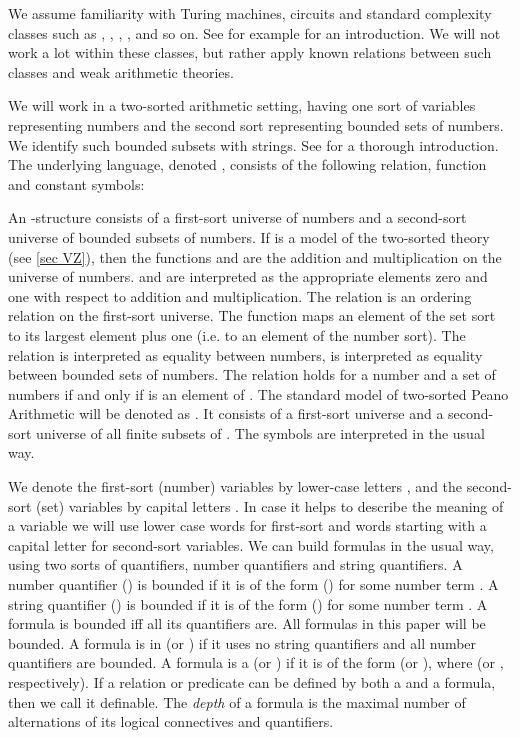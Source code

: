 \documentclass{LMCS}
\begin{document}
We assume familiarity with Turing machines, circuits and standard complexity classes such as ,
, , ,  and so on. See for example
\cite{AB09} for an introduction. We will not work a lot within these classes, but rather apply known relations
between such classes and weak arithmetic theories.

We will work in a two-sorted arithmetic setting, having one sort of variables representing numbers and the
second sort representing bounded sets of numbers. We identify such bounded subsets with strings. See \cite{CN10}
for a thorough introduction. The underlying language, denoted \LTwoA, consists of the following relation,
function and constant symbols:

An  \LTwoA-structure  consists of a first-sort universe  of numbers and a second-sort universe 
of bounded subsets of numbers.  If  is a model of the two-sorted theory  (see \ref{sec VZ}), then the
functions  and  are the addition and multiplication on the universe of numbers.  and  are
interpreted as the appropriate elements zero and one with respect to addition and multiplication. The relation
 is an ordering relation on the first-sort universe. The function  maps an element of the set
sort to its largest element plus one (i.e. to an element of the number sort). The relation  is interpreted
as equality between numbers,  is interpreted as equality between bounded sets of numbers. The relation
 holds for a number  and a set of numbers  if and only if  is an element of . The standard
model of two-sorted Peano Arithmetic will be denoted as . It consists of a first-sort universe
 and a second-sort universe  of all finite subsets of . The symbols are interpreted in the
usual way.

We denote the first-sort (number) variables by lower-case letters , and the second-sort (set)
variables by capital letters . In case it helps to describe the meaning of a variable we will use lower case words for first-sort and words starting with a capital letter for second-sort variables. We can build formulas in the usual way, using two sorts of
quantifiers, number quantifiers and string quantifiers. A number quantifier  () is bounded
if it is of the form  () for some number
term . A string quantifier  () is bounded if it is of the form  () for some number term . A formula is bounded iff
all its quantifiers are. All formulas in this paper will be bounded. A formula  is in  (or
) if it uses no string quantifiers and all number quantifiers are bounded. A formula  is a
 (or ) if it is of the form 
(or ), where  (or ,
respectively). If a relation or predicate can be defined by both a  and a  formula, then we
call it  definable. The {\em depth} of a formula is the maximal number of alternations of its
logical connectives and quantifiers.
\end{document}
